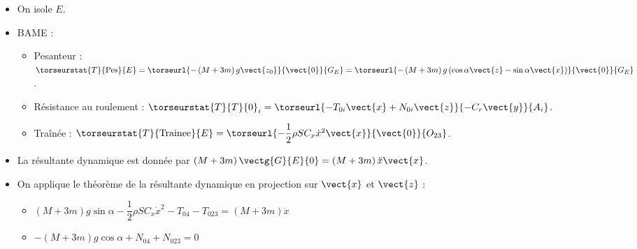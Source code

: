 \begin{multicols}{2}
\ifprof
\begin{corrige}
\begin{itemize}
\item On isole $E$.
\item BAME : 
\begin{itemize}
\item Pesanteur : $\torseurstat{T}{\text{Pes}}{E}=\torseurl{-\left(M+3m\right)g\vect{z_0}}{\vect{0}}{G_E}=\torseurl{-\left(M+3m\right)g\left( \cos \alpha \vect{z}-\sin \alpha \vect{x} \right)}{\vect{0}}{G_E}$.
\item Résistance au roulement : $\torseurstat{T}{T}{0}_i=\torseurl{-T_{0i}\vect{x}+N_{0i}\vect{z}}{-C_r\vect{y}}{A_i}$.
\item Traînée : $\torseurstat{T}{\text{Trainee}}{E}=\torseurl{-\dfrac{1}{2}\rho S C_x \dot{x}^2 \vect{x}}{\vect{0}}{O_{23}}$.
\end{itemize}
\item La résultante dynamique est donnée par $\left(M+3m\right)\vectg{G}{E}{0}=\left(M+3m\right)\ddot{x}\vect{x}$.
\item On applique le théorème de la résultante dynamique en projection sur $\vect{x}$ et $\vect{z}$ : 
\begin{itemize}
\item $\left(M+3m\right)g\sin \alpha -\dfrac{1}{2}\rho S C_x \dot{x}^2-T_{04}-T_{023}=\left(M+3m\right)\ddot{x}$
\item $-\left(M+3m\right)g \cos \alpha +N_{04}+N_{023}=0$
\end{itemize}
\end{itemize}
\end{corrige}
\else
\fi


\end{multicols}
